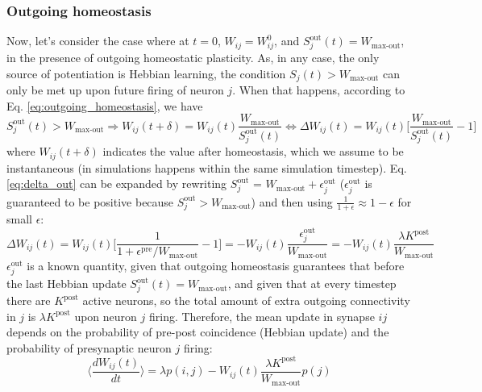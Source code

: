 \documentclass{article}
\begin{document}
\subsubsection*{Outgoing homeostasis}
Now, let's consider the case where at $t = 0$, $W_{ij} = W^0_{ij}$, and $S^\textrm{out}_j(t) = W_\textrm{max-out}$, in the presence of outgoing homeostatic plasticity. As, in any case, the only source of potentiation is Hebbian learning, the condition  $S_j(t) > W_\textrm{max-out}$ can only be met up upon future firing of neuron $j$. When that happens, according to Eq. \eqref{eq:outgoing_homeostasis}, we have
\begin{equation}
    S^\textrm{out}_j(t) >W_\textrm{max-out} \Longrightarrow W_{ij}(t+\delta) = W_{ij}(t) \frac{W_\textrm{max-out}}{S^\textrm{out}_j(t)} \Longleftrightarrow  \Delta W_{ij}(t) = W_{ij}(t)\Big[\frac{W_\textrm{max-out}}{S^\textrm{out}_j(t)} - 1\Big]
    \label{eq:delta_out}
\end{equation}
where $W_{ij}(t + \delta)$ indicates the value after homeostasis, which we assume to be instantaneous (in simulations happens within the same simulation timestep). 
\newline\newline
Eq. \eqref{eq:delta_out} can be expanded by rewriting $S_j^\textrm{out}$ = $W_\textrm{max-out} + \epsilon^\textrm{out}_j$ ($\epsilon_j^\textrm{out}$ is guaranteed to be positive because $S_j^\textrm{out} > W_\textrm{max-out}$) and then using $\frac{1}{1 + \epsilon} \approx 1 - \epsilon$ for small $\epsilon$:
\begin{equation}
    \Delta W_{ij}(t) = W_{ij}(t)\Big[\frac{1}{1 + \epsilon^\textrm{pre}/W_\textrm{max-out}} - 1\Big] = - W_{ij}(t)\frac{\epsilon^\textrm{out}_j}{W_\textrm{max-out}} = -W_{ij}(t)\frac{\lambda K^\textrm{post}}{W_\textrm{max-out}}
\end{equation}
$\epsilon_j^\textrm{out}$ is a known quantity, given that outgoing homeostasis guarantees that before the last Hebbian update $S^\textrm{out}_j(t) = W_\textrm{max-out}$, and given 
that at every timestep there are $K^\textrm{post}$ active neurons, so the total amount of extra outgoing connectivity in $j$ is $\lambda K^\textrm{post}$ upon neuron $j$ firing.
\newline\newline
Therefore, the mean update in synapse $ij$ depends on the probability of pre-post coincidence (Hebbian update) and the probability of presynaptic neuron $j$ firing:
\begin{equation}
    \Big\langle \frac{dW_{ij}(t)}{dt} \Big\rangle = \lambda p(i, j) -W_{ij}(t)\frac{\lambda K^\textrm{post}}{W_\textrm{max-out}}p(j)
\end{equation}
\end{document}
